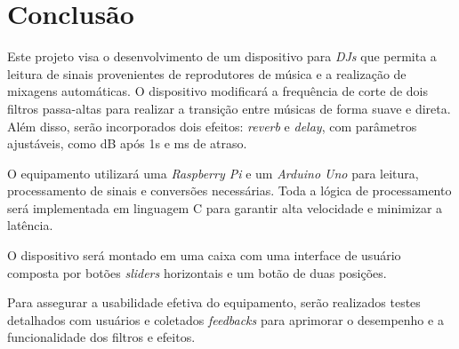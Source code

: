 \chapter[Conclusão]{Conclusão}

Este projeto visa o desenvolvimento de um dispositivo para \textit{DJs} que permita a leitura de sinais provenientes de reprodutores de música e a realização de mixagens automáticas. O dispositivo modificará a frequência de corte de dois filtros passa-altas para realizar a transição entre músicas de forma suave e direta. Além disso, serão incorporados dois efeitos: \textit{reverb} e \textit{delay}, com parâmetros ajustáveis, como dB após 1s e ms de atraso.

O equipamento utilizará uma \textit{Raspberry Pi} e um \textit{Arduino Uno} para leitura, processamento de sinais e conversões necessárias. Toda a lógica de processamento será implementada em linguagem C para garantir alta velocidade e minimizar a latência.

O dispositivo será montado em uma caixa com uma interface de usuário composta por botões \textit{sliders} horizontais e um botão de duas posições.

Para assegurar a usabilidade efetiva do equipamento, serão realizados testes detalhados com usuários e coletados \textit{feedbacks} para aprimorar o desempenho e a funcionalidade dos filtros e efeitos.
